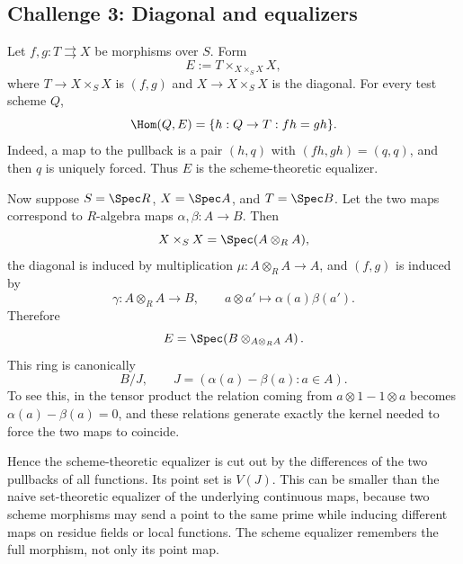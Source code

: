 \subsection*{Challenge 3: Diagonal and equalizers}
\begin{solution}
Let $f,g:T\rightrightarrows X$ be morphisms over $S$.  Form
\[
E:=T\times_{X\times_SX}X,
\]
where $T\to X\times_SX$ is $(f,g)$ and $X\to X\times_SX$ is the diagonal.  For every test
scheme $Q$,
\[
\Hom(Q,E)
=
\{h:Q\to T: f h=g h\}.
\]
Indeed, a map to the pullback is a pair $(h,q)$ with
$(fh,gh)=(q,q)$, and then $q$ is uniquely forced.  Thus $E$ is the scheme-theoretic equalizer.

Now suppose $S=\Spec R$, $X=\Spec A$, and $T=\Spec B$.  Let the two maps correspond to
$R$-algebra maps $\alpha,\beta:A\to B$.  Then
\[
X\times_SX=\Spec(A\otimes_RA),
\]
the diagonal is induced by multiplication $\mu:A\otimes_RA\to A$, and $(f,g)$ is induced by
\[
\gamma:A\otimes_RA\to B,\qquad
a\otimes a'\mapsto\alpha(a)\beta(a').
\]
Therefore
\[
E=\Spec\!\left(B\otimes_{A\otimes_RA}A\right).
\]
This ring is canonically
\[
B/J,\qquad
J=(\alpha(a)-\beta(a):a\in A).
\]
To see this, in the tensor product the relation coming from
$a\otimes1-1\otimes a$ becomes $\alpha(a)-\beta(a)=0$, and these relations generate exactly the
kernel needed to force the two maps to coincide.

Hence the scheme-theoretic equalizer is cut out by the differences of the two pullbacks of all
functions.  Its point set is $V(J)$.  This can be smaller than the naive set-theoretic equalizer
of the underlying continuous maps, because two scheme morphisms may send a point to the same
prime while inducing different maps on residue fields or local functions.  The scheme equalizer
remembers the full morphism, not only its point map.
\end{solution}

